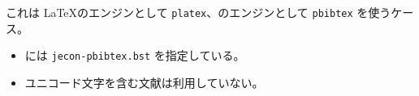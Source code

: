 \documentclass[platex]{jsarticle}
\begin{document}
これは \LaTeX のエンジンとして \texttt{platex}、\BibTeX のエンジンとして
\texttt{pbibtex} を使うケース。
\begin{itemize}
 \item \verb|| には \verb|jecon-pbibtex.bst| を指定している。
 \item ユニコード文字を含む文献は利用していない。
\end{itemize}


\vspace{1em}



\nocite{*}

%


%

\end{document}
